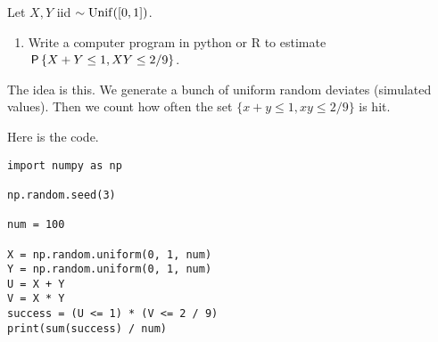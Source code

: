 \documentclass[assignments]{subfiles}
\begin{document}
\begin{exercise}
Let $X, Y$ iid $\sim \Unif{[0,1]}$.
\begin{enumerate}
\item Write a computer program in python or R to  estimate $\P{X+Y\leq 1, X Y\leq 2/9}$.
\end{enumerate}
\begin{solution}
  The idea is this.
  We generate a bunch of uniform random deviates (simulated values).
  Then we count how often the set $\{x+y\leq 1, xy \leq 2/9\}$ is hit.

Here is the code.
\begin{verbatim}
import numpy as np

np.random.seed(3)

num = 100

X = np.random.uniform(0, 1, num)
Y = np.random.uniform(0, 1, num)
U = X + Y
V = X * Y
success = (U <= 1) * (V <= 2 / 9)
print(sum(success) / num)
\end{verbatim}
\end{solution}
\end{exercise}
\end{document}
